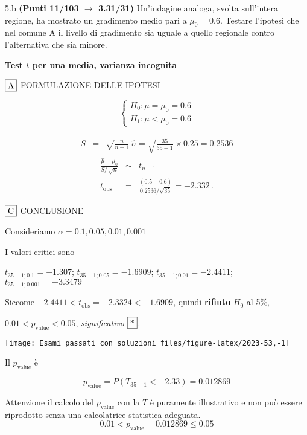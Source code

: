 \documentclass[
  11pt,
]{book}
\theoremstyle{mytheoremstyle}
\theoremstyle{mydefstyle}
\newenvironment{sol}
  {
  \begin{tcolorbox}[enhanced,breakable,arc=0.1mm,boxrule=1pt,colback=white,colframe=iblue,
  title=\bf \fontfamily{lmss}\selectfont \hspace{.5 cm} Soluzione,drop fuzzy shadow]

}{
\end{tcolorbox}
  }
\begin{document}
5.b \textbf{(Punti 11/103 \(\rightarrow\) 3.31/31)} Un'indagine analoga, svolta sull'intera regione, ha mostrato un gradimento medio pari a \(\mu_0=0.6\). Testare l'ipotesi che nel comune A il livello di gradimento sia uguale a quello regionale contro l'alternativa che sia minore.

\begin{sol}
\textbf{Test \(t\) per una media, varianza incognita}

\(\fbox{A}\) FORMULAZIONE DELLE IPOTESI

\[\begin{cases}
   H_0: \mu = \mu_0=0.6 \\
   H_1: \mu < \mu_0=0.6 
   \end{cases}\]

\begin{eqnarray*}
   S    &=& \sqrt{\frac{n} {n-1}}\ \widehat{\sigma} 
   =  \sqrt{\frac{ 35 } { 35 -1}} \times  0.25  =  0.2536 
   \end{eqnarray*}
\begin{eqnarray*}
   \frac{\hat\mu - \mu_{0}} {S/\,\sqrt{n}}&\sim&t_{n-1}\\
   t_{\text{obs}}
   &=& \frac{ ( 0.5 -  0.6 )} { 0.2536 /\sqrt{ 35 }}
   =   -2.332 \, .
   \end{eqnarray*}

\(\fbox{C}\) CONCLUSIONE

Consideriamo \(\alpha=0.1, 0.05, 0.01, 0.001\)

I valori critici sono

\(t_{35-1;0.1}=-1.307\); \(t_{35-1;0.05}=-1.6909\); \(t_{35-1;0.01}=-2.4411\); \(t_{35-1;0.001}=-3.3479\)

Siccome \(-2.4411<t_\text{obs}=-2.3324<-1.6909\), quindi \textbf{rifiuto} \(H_0\) al 5\%,

\(0.01<p_\text{value}<0.05\), \emph{significativo} \(\fbox{*}\).

\begin{center}\texttt{[image: Esami\_passati\_con\_soluzioni\_files/figure-latex/2023-53,-1]} \end{center}

Il \(p_{\text{value}}\) è

\[ p_{\text{value}} = P(T_{35-1}<-2.33)=0.012869 \]

Attenzione il calcolo del \(p_\text{value}\) con la \(T\) è puramente illustrativo e non può essere riprodotto senza una calcolatrice statistica adeguata.\[
 0.01 < p_\text{value}= 0.012869 \leq 0.05 
\]

\end{sol}
\end{document}
